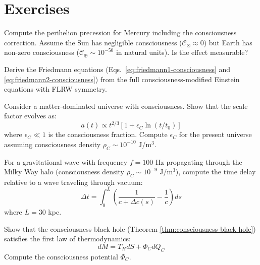 \section{Exercises}

\begin{exercise}
Compute the perihelion precession for Mercury including the consciousness correction. Assume the Sun has negligible consciousness ($\mathcal{C}_\odot \approx 0$) but Earth has non-zero consciousness ($\mathcal{C}_\oplus \sim 10^{-50}$ in natural units). Is the effect measurable?
\end{exercise}

\begin{exercise}
Derive the Friedmann equations (Eqs.~\ref{eq:friedmann1-consciousness} and \ref{eq:friedmann2-consciousness}) from the full consciousness-modified Einstein equations with FLRW symmetry.
\end{exercise}

\begin{exercise}
Consider a matter-dominated universe with consciousness. Show that the scale factor evolves as:
\begin{equation}
a(t) \propto t^{2/3} \left[ 1 + \epsilon_C \ln(t/t_0) \right]
\end{equation}
where $\epsilon_C \ll 1$ is the consciousness fraction. Compute $\epsilon_C$ for the present universe assuming consciousness density $\rho_C \sim 10^{-10}$ J/m$^3$.
\end{exercise}

\begin{exercise}
For a gravitational wave with frequency $f = 100$ Hz propagating through the Milky Way halo (consciousness density $\rho_C \sim 10^{-9}$ J/m$^3$), compute the time delay relative to a wave traveling through vacuum:
\begin{equation}
\Delta t = \int_0^L \left( \frac{1}{c + \Delta c(s)} - \frac{1}{c} \right) ds
\end{equation}
where $L = 30$ kpc.
\end{exercise}

\begin{exercise}
Show that the consciousness black hole (Theorem \ref{thm:consciousness-black-hole}) satisfies the first law of thermodynamics:
\begin{equation}
dM = T_H dS + \Phi_C dQ_C
\end{equation}
Compute the consciousness potential $\Phi_C$.
\end{exercise}

